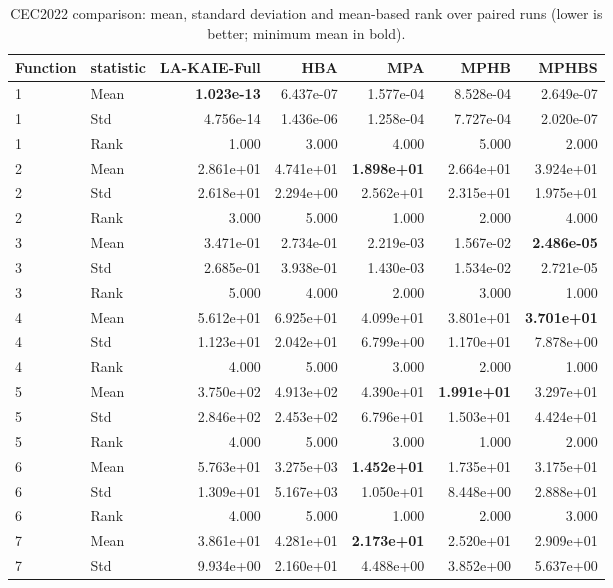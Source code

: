 \begin{table}[t]
\centering
\scriptsize
\caption{CEC2022 comparison: mean, standard deviation and mean-based rank over paired runs (lower is better; minimum mean in bold).}
\label{tab:cec2022_comparison}
\begin{tabular}{llrrrrr}
\hline
Function & statistic & LA-KAIE-Full & HBA & MPA & MPHB & MPHBS \\
\hline
1 & Mean & \textbf{1.023e-13} & 6.437e-07 & 1.577e-04 & 8.528e-04 & 2.649e-07 \\
1 & Std & 4.756e-14 & 1.436e-06 & 1.258e-04 & 7.727e-04 & 2.020e-07 \\
1 & Rank & 1.000 & 3.000 & 4.000 & 5.000 & 2.000 \\
2 & Mean & 2.861e+01 & 4.741e+01 & \textbf{1.898e+01} & 2.664e+01 & 3.924e+01 \\
2 & Std & 2.618e+01 & 2.294e+00 & 2.562e+01 & 2.315e+01 & 1.975e+01 \\
2 & Rank & 3.000 & 5.000 & 1.000 & 2.000 & 4.000 \\
3 & Mean & 3.471e-01 & 2.734e-01 & 2.219e-03 & 1.567e-02 & \textbf{2.486e-05} \\
3 & Std & 2.685e-01 & 3.938e-01 & 1.430e-03 & 1.534e-02 & 2.721e-05 \\
3 & Rank & 5.000 & 4.000 & 2.000 & 3.000 & 1.000 \\
4 & Mean & 5.612e+01 & 6.925e+01 & 4.099e+01 & 3.801e+01 & \textbf{3.701e+01} \\
4 & Std & 1.123e+01 & 2.042e+01 & 6.799e+00 & 1.170e+01 & 7.878e+00 \\
4 & Rank & 4.000 & 5.000 & 3.000 & 2.000 & 1.000 \\
5 & Mean & 3.750e+02 & 4.913e+02 & 4.390e+01 & \textbf{1.991e+01} & 3.297e+01 \\
5 & Std & 2.846e+02 & 2.453e+02 & 6.796e+01 & 1.503e+01 & 4.424e+01 \\
5 & Rank & 4.000 & 5.000 & 3.000 & 1.000 & 2.000 \\
6 & Mean & 5.763e+01 & 3.275e+03 & \textbf{1.452e+01} & 1.735e+01 & 3.175e+01 \\
6 & Std & 1.309e+01 & 5.167e+03 & 1.050e+01 & 8.448e+00 & 2.888e+01 \\
6 & Rank & 4.000 & 5.000 & 1.000 & 2.000 & 3.000 \\
7 & Mean & 3.861e+01 & 4.281e+01 & \textbf{2.173e+01} & 2.520e+01 & 2.909e+01 \\
7 & Std & 9.934e+00 & 2.160e+01 & 4.488e+00 & 3.852e+00 & 5.637e+00 \\

\end{tabular}
\end{table}
